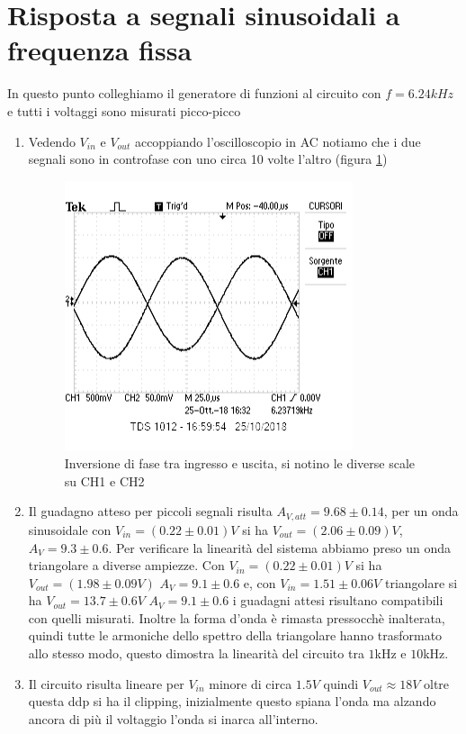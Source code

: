 \documentclass[10pt,a4paper]{article}
\begin{document}
\section{Risposta a segnali sinusoidali a frequenza fissa}
In questo punto colleghiamo il generatore di funzioni al circuito con $f=6.24kHz$ e tutti i voltaggi sono misurati picco-picco
\begin{enumerate}
\item Vedendo $V_{in}$ e $V_{out}$ accoppiando l'oscilloscopio in AC notiamo che i due segnali sono in controfase con uno circa 10 volte l'altro (figura \ref{screen})
\begin{figure}
\centering
\includegraphics[scale=1]{3_1.png}
\caption{Inversione di fase tra ingresso e uscita, si notino le diverse scale su CH1 e CH2}
\label{screen} 
\end{figure}

\item Il guadagno atteso per piccoli segnali risulta $A_{V,att}=9.68\pm0.14$, per un onda sinusoidale con $V_{in} = (0.22\pm0.01)V$ si ha $V_{out} = (2.06\pm0.09)V$, $A_V=9.3\pm0.6$. Per verificare la linearità del sistema abbiamo preso un onda triangolare a diverse ampiezze. Con $V_{in} = (0.22\pm0.01)V$ si ha $V_{out} = (1.98\pm0.09V)$ $A_V=9.1\pm0.6$ e, con $V_{in} = 1.51\pm0.06V$  triangolare si ha $V_{out} = 13.7\pm0.6V$ $A_V=9.1\pm0.6$ i guadagni attesi risultano compatibili con quelli misurati.\newline
Inoltre la forma d'onda è rimasta pressocchè inalterata, quindi tutte le armoniche dello spettro della triangolare hanno trasformato allo stesso modo, questo dimostra la linearità del circuito tra $1$kHz e $10$kHz.\newline
\item Il circuito risulta lineare per $V_{in}$ minore di circa $1.5 V$ quindi $V_{out} \approx 18 V$ oltre questa ddp si ha il clipping, inizialmente questo spiana l'onda ma alzando ancora di più il voltaggio l'onda si inarca all'interno. 
\end{enumerate} 
\end{document}
